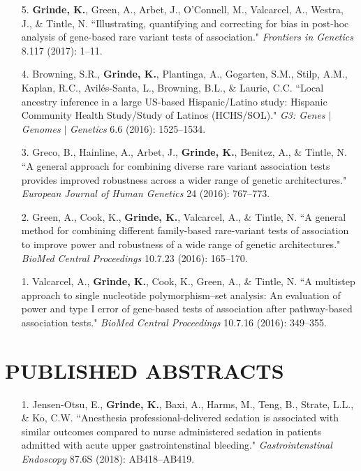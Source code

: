 \documentclass[margin]{res}
\begin{document}
\begin{resume}
\begin{itemize}
\item[5.] \textbf{Grinde, K.}, Green, A., Arbet, J., O'Connell, M., Valcarcel, A., Westra, J., \& Tintle, N. ``Illustrating, quantifying and correcting for bias in post-hoc analysis of gene-based rare variant tests of association." \textit{Frontiers in Genetics} 8.117 (2017): 1--11. 

\item[4.] Browning, S.R., \textbf{Grinde, K.}, Plantinga, A., Gogarten, S.M., Stilp, A.M., Kaplan, R.C., Avil\'es-Santa, L., Browning, B.L., \& Laurie, C.C. ``Local ancestry inference in a large US-based Hispanic/Latino study: Hispanic Community Health Study/Study of Latinos (HCHS/SOL)." \textit{G3: Genes} $|$ \textit{Genomes} $|$ \textit{Genetics} 6.6 (2016): 1525--1534.

\item[3.] Greco, B., Hainline, A., Arbet, J., \textbf{Grinde, K.}, Benitez, A., \& Tintle, N. ``A general approach for combining diverse rare variant association tests provides improved robustness across a wider range of genetic architectures." \textit{European Journal of Human Genetics} 24 (2016): 767--773.

\item[2.] Green, A., Cook, K., \textbf{Grinde, K.}, Valcarcel, A., \& Tintle, N. ``A general method for combining different family-based rare-variant tests of association to improve power and robustness of a wide range of genetic architectures." \textit{BioMed Central Proceedings} 10.7.23 (2016): 165--170.

\item[1.] Valcarcel, A., \textbf{Grinde, K.}, Cook, K., Green, A., \& Tintle, N. ``A multistep approach to single nucleotide polymorphism--set analysis: An evaluation of power and type I error of gene-based tests of association after pathway-based association tests." \textit{BioMed Central Proceedings} 10.7.16 (2016): 349--355. \\
\end{itemize}

\section{PUBLISHED ABSTRACTS}

\begin{itemize}
\item[1.] Jensen-Otsu, E., \textbf{Grinde, K.}, Baxi, A., Harms, M., Teng, B., Strate, L.L., \& Ko, C.W. 
``Anesthesia professional-delivered sedation is associated with similar outcomes compared to nurse administered sedation in patients admitted with acute upper gastrointenstinal bleeding." \textit{Gastrointenstinal Endoscopy} 87.6S (2018):  AB418--AB419.\\
\end{itemize}


\end{resume}
\end{document}
